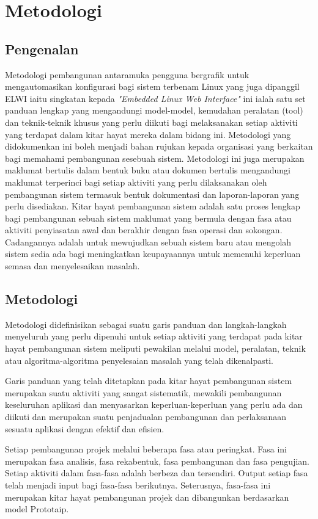 \chapter{Metodologi}\label{c3}

\section{Pengenalan}
Metodologi pembangunan antaramuka pengguna bergrafik untuk mengautomasikan konfigurasi bagi sistem terbenam Linux yang juga dipanggil ELWI iaitu singkatan kepada \textit{"Embedded Linux Web Interface"} ini ialah satu set panduan lengkap yang mengandungi model-model, kemudahan peralatan (tool) dan teknik-teknik khusus yang perlu diikuti bagi melaksanakan setiap aktiviti yang terdapat dalam kitar hayat mereka dalam bidang ini. Metodologi yang didokumenkan ini boleh menjadi bahan rujukan kepada organisasi yang berkaitan bagi memahami pembangunan sesebuah sistem. Metodologi ini juga merupakan maklumat bertulis dalam bentuk buku atau dokumen bertulis mengandungi maklumat terperinci bagi setiap aktiviti yang perlu dilaksanakan oleh pembangunan sistem termasuk bentuk dokumentasi dan laporan-laporan yang perlu disediakan. Kitar hayat pembangunan sistem adalah satu proses lengkap bagi pembangunan sebuah sistem maklumat yang bermula dengan fasa atau aktiviti penyiasatan awal dan berakhir dengan fasa operasi dan sokongan. Cadangannya adalah untuk mewujudkan sebuah sistem baru atau mengolah sistem sedia ada bagi meningkatkan keupayaannya untuk memenuhi keperluan semasa dan menyelesaikan masalah.

\section{Metodologi}
Metodologi didefinisikan sebagai suatu garis panduan dan langkah-langkah menyeluruh yang perlu dipenuhi untuk setiap aktiviti yang terdapat pada kitar hayat pembangunan sistem meliputi pewakilan melalui model, peralatan, teknik atau algoritma-algoritma penyelesaian masalah yang telah dikenalpasti. 

Garis panduan yang telah ditetapkan pada kitar hayat pembangunan sistem merupakan suatu aktiviti yang sangat sistematik, mewakili pembangunan keseluruhan aplikasi dan menyasarkan keperluan-keperluan yang perlu ada dan diikuti dan merupakan suatu penjadualan pembangunan dan perlaksanaan sesuatu aplikasi dengan efektif dan efisien.

Setiap pembangunan projek melalui beberapa fasa atau peringkat. Fasa ini merupakan fasa analisis, fasa rekabentuk, fasa pembangunan dan fasa pengujian. Setiap aktiviti dalam fasa-fasa adalah berbeza dan tersendiri. Output setiap fasa telah menjadi input bagi fasa-fasa berikutnya. Seterusnya, fasa-fasa ini merupakan kitar hayat pembangunan projek dan dibangunkan berdasarkan model Prototaip.

